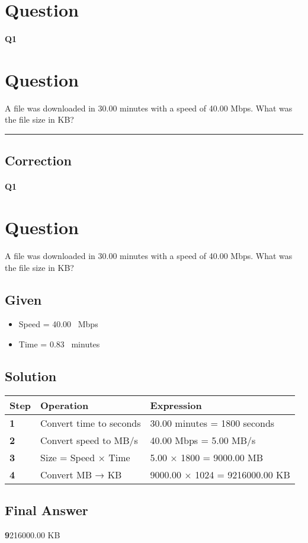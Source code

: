 
\section{Question}


\paragraph{Q1}

\section*{Question}
A file was downloaded in 30.00 minutes with a speed of 40.00 Mbps. What was the file size in KB?



\hrule width 1\linewidth
\pagebreak

\subsection{Correction}


\paragraph{Q1}

\section*{Question}
A file was downloaded in 30.00 minutes with a speed of 40.00 Mbps. What was the file size in KB?
\subsection*{Given}
\begin{itemize}
  \item Speed = 40.00 \, Mbps
  \item Time = 0.83 \, minutes
\end{itemize}

\subsection*{Solution}
\begin{tabular}{>{\bfseries}p{1cm} p{4cm} p{8cm}}
\toprule
Step & Operation & Expression \\
\midrule
1 & Convert time to seconds & 30.00 minutes = 1800 seconds \\
2 & Convert speed to MB/s & 40.00 Mbps = 5.00 MB/s \\
3 & Size = Speed × Time & 5.00 × 1800 = 9000.00 MB \\
4 & Convert MB → KB & 9000.00 × 1024 = 9216000.00 KB \\
\bottomrule
\end{tabular}

\subsection*{Final Answer}
\textbf9216000.00 KB

\pagebreak